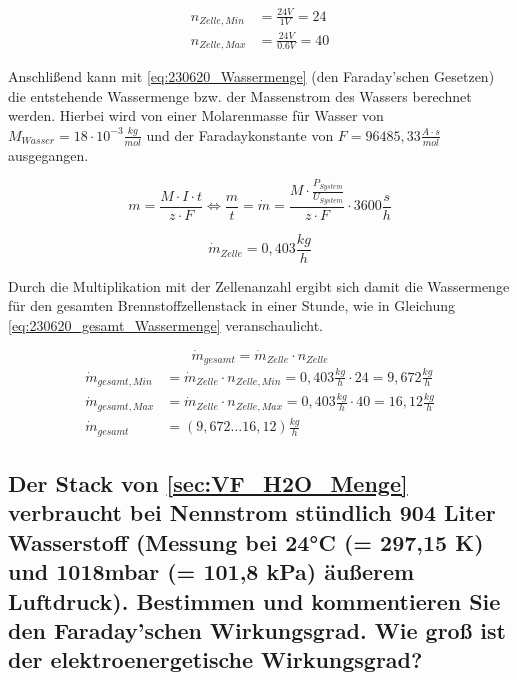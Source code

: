 \begin{align}
    n_{Zelle,Min} &= \frac{24V}{1V} = 24 \nonumber\\
    n_{Zelle,Max} &= \frac{24V}{0.6V} = 40 \nonumber
\end{align}

Anschlißend kann mit \autoref{eq:230620_Wassermenge} (den Faraday'schen Gesetzen) die entstehende Wassermenge bzw. der Massenstrom des Wassers berechnet werden.
Hierbei wird von einer Molarenmasse für Wasser von $M_{Wasser} = 18 \cdot 10^{-3} \frac{kg}{mol}$ und der Faradaykonstante von $F =96485,33 \frac{A\cdot s}{mol}$ ausgegangen.

\begin{equation}
    m = \frac{M \cdot I \cdot t}{z \cdot F} \Leftrightarrow \frac{m}{t} = \dot{m} = \frac{M \cdot \frac{P_{System}}{U_{System}}}{z \cdot F} \cdot 3600 \frac{s}{h}
    \label{eq:230620_Wassermenge}
\end{equation}

$$\dot{m}_{Zelle} = 0,403 \frac{kg}{h}$$

Durch die Multiplikation mit der Zellenanzahl ergibt sich damit die Wassermenge für den gesamten Brennstoffzellenstack in einer Stunde, wie in Gleichung \autoref{eq:230620_gesamt_Wassermenge} veranschaulicht.

\begin{equation}
    \dot{m}_{gesamt} = \dot{m}_{Zelle} \cdot n_{Zelle}
    \label{eq:230620_gesamt_Wassermenge}
\end{equation}
\begin{align}
    \dot{m}_{gesamt,Min} &= \dot{m}_{Zelle} \cdot n_{Zelle,Min} = 0,403 \frac{kg}{h} \cdot 24 = 9,672 \frac{kg}{h} \nonumber\\
    \dot{m}_{gesamt,Max} &= \dot{m}_{Zelle} \cdot n_{Zelle,Max} = 0,403 \frac{kg}{h} \cdot 40 = 16,12 \frac{kg}{h} \nonumber\\
    \dot{m}_{gesamt} &= (9,672 \dots 16,12) \frac{kg}{h} \nonumber
\end{align}

\subsection{Der Stack von \ref{sec:VF_H2O_Menge} verbraucht bei Nennstrom stündlich 904 Liter Wasserstoff (Messung bei 24°C (= 297,15 K) und 1018mbar (= 101,8 kPa) äußerem Luftdruck). 
Bestimmen und kommentieren Sie den Faraday'schen Wirkungsgrad. Wie groß ist der elektroenergetische Wirkungsgrad?}

